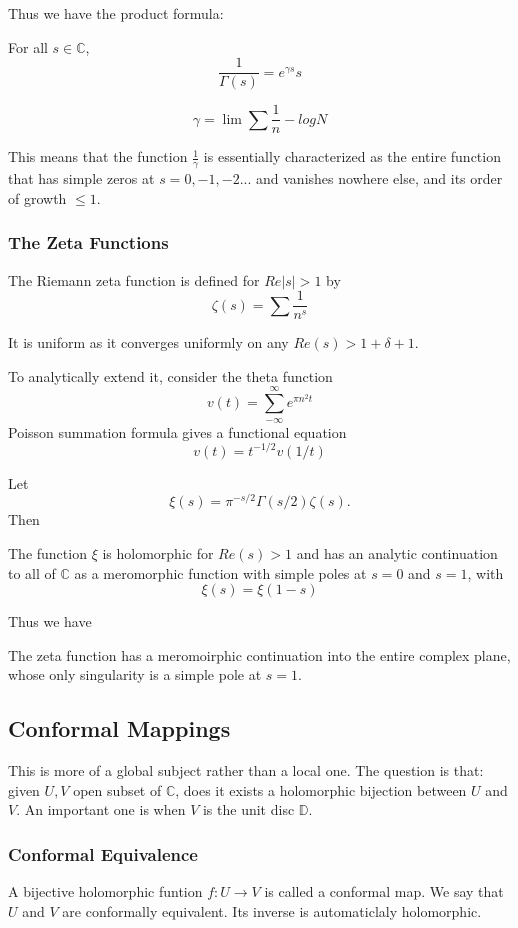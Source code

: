 \documentclass[main.tex]{subfiles}
\begin{document}
Thus we have the product formula:

\begin{theorem}
For all $s \in \mathbb{C}$, 
$$
\frac{1}{\Gamma(s)} = e^{\gamma s} s 
$$
\end{theorem}

$$\gamma = \lim \sum \frac{1}{n} - log N$$

This means that the function $\frac{1}{\gamma}$ is essentially characterized as the entire function that has simple zeros at $s = 0, -1, -2...$ and vanishes nowhere else, and its order of growth $\leq 1$.


\subsubsection{The Zeta Functions}

The Riemann zeta function is defined for $Re|s| > 1$ by 
$$
\zeta(s) = \sum \frac{1}{n^s}
$$

It is uniform as it converges uniformly on any $Re(s) > 1 + \delta + 1$.

To analytically extend it, consider the theta function 
$$
v(t) = \sum_{-\infty} ^{\infty} e^{\pi n^2 t}
$$
Poisson summation formula gives a functional equation 
$$
v(t) = t^{-1/2} v(1/t)
$$

Let 
$$
\xi(s) = \pi^{-s/2}\Gamma(s/2)\zeta(s).
$$
Then 
\begin{theorem}
The function $\xi$ is holomorphic for $Re(s) > 1$ and has an analytic continuation to all of $\mathbb{C}$ as a meromorphic function with simple poles at $s = 0$ and $s = 1$, with 
$$
\xi(s) = \xi(1-s)
$$
\end{theorem}

Thus we have 
\begin{theorem}
The zeta function has a meromoirphic continuation into the entire complex plane, whose only singularity is a simple pole at $s = 1$.
\end{theorem}


\subsection{Conformal Mappings}
This is more of a global subject rather than a local one. The question is that: given $U, V$ open subset of $\mathbb{C}$, does it exists a holomorphic bijection between $U$ and $V$. An important one is when $V$ is the unit disc $\mathbb{D}$.

\subsubsection{Conformal Equivalence}
A bijective holomorphic funtion $f: U \rightarrow V$ is called a conformal map. We say that $U$ and $V$ are conformally equivalent. Its inverse is automaticlaly holomorphic.
\end{document}
